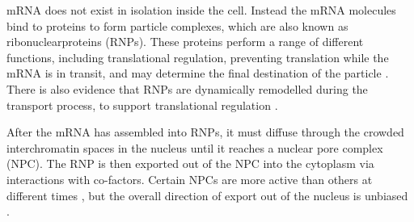 \documentclass[twocolumn]{biophys}
\begin{document}
mRNA does not exist in isolation inside the cell.
Instead the mRNA molecules bind to proteins to form particle complexes, which are also known as ribonuclearproteins (RNPs). 
These proteins perform a range of different functions, including translational regulation, preventing translation while the mRNA is in transit, and may determine the final destination of the particle \citep{hamilton2013multidisciplinary}.
There is also evidence that RNPs are dynamically remodelled during the transport process, to support translational regulation \citep{weil2012drosophila}.

After the mRNA has assembled into RNPs, it must diffuse through the crowded interchromatin spaces in the nucleus until it reaches a nuclear pore complex (NPC).
The RNP is then exported out of the NPC into the cytoplasm via interactions with co-factors.
Certain NPCs are more active than others at different times \citep{weil2012drosophila}, but the overall direction of export out of the nucleus is unbiased \citep{wilkie2001drosophila}. 
\end{document}
